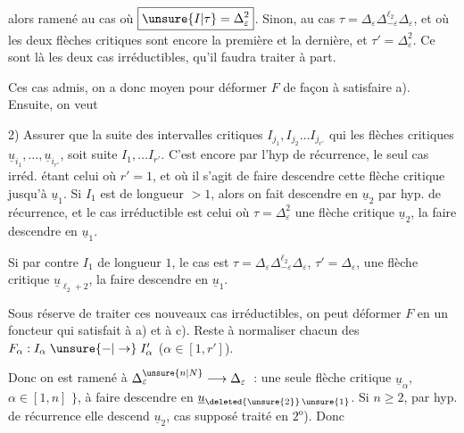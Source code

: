 alors ramené au cas où $\boxed{\unsure{I|\tau}=\Delta_\varepsilon^2}$. Sinon, au cas  $\boxed{\tau=\Delta_\varepsilon\Delta_{-\varepsilon}^{\ell_2}\Delta_\varepsilon}$,  et où  les deux flèches critiques sont encore la première et la dernière, et $\tau'=\Delta_\varepsilon^2$. Ce sont là les deux cas irréductibles, qu'il  faudra traiter  à part.

 Ces cas admis, on a donc moyen pour déformer $F$ de façon à satisfaire a).  Ensuite, on veut

2) Assurer que la suite des intervalles critiques $I_{j_1},I_{j_2}\ldots I_{j_{r'}}$ qui  les flèches critiques $\underline{u}_{i_1},\ldots,\underline{u}_{i_{r'}}$,  soit  suite $I_1,\ldots I_{r'}$.
C'est encore  par l'hyp de récurrence, le seul cas irréd. étant celui où $r'=1$, et où il  s'agit de faire descendre cette flèche critique jusqu'à $\underline{u}_1$. Si $I_1$ est de longueur $>1$, alors on fait descendre en $\underline{u}_2$ par hyp. de récurrence, et le cas irréductible est celui où $\boxed{\tau=\Delta_\varepsilon^2}$ une flèche critique $\underline{u}_2$, la faire descendre en $\underline{u}_1$.

Si par contre $I_1$ de longueur $1$, le cas  est $\boxed{\tau=\Delta_\varepsilon\Delta_{-\varepsilon}^{\ell_2}\Delta_\varepsilon}$,  $\tau'=\Delta_\varepsilon$, une flèche critique $\underline{u}_{\ell_2+2}$, la faire descendre en $\underline{u}_1$.

Sous réserve de traiter ces  nouveaux cas irréductibles, on peut déformer $F$ en un foncteur qui satisfait à a) et à c). Reste à normaliser chacun des $F_\alpha:I_\alpha\mathrel{\unsure{-|\to}}I'_\alpha$ ($\alpha\in[1,r']$).

Donc on est ramené à $\Delta_\varepsilon^{\unsure{n|N}}\longrightarrow\Delta_\varepsilon$~: \unsure{$\{$}une seule flèche critique\unsure{$\}$} $\underline{u}_\alpha$, $\alpha\in[1,n]$ $\}$, à faire descendre en $\underline{u}_{\deleted{\unsure{2}}\,\unsure{1}}$. Si $n\geq2$, par hyp. de récurrence elle descend  $\underline{u}_2$, cas supposé traité en $2^{\mathrm{o}}$). Donc
